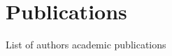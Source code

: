 \chapter*{Publications}
\label{chap:Publications}


List of authors academic publications

\begingroup
\titleformat{\chapter}[display]
    {\normalfont\huge\bfseries}{\chaptertitlename\ \thechapter}{20pt}{\Huge}
\titlespacing*{\chapter}{0pt}{0pt}{-80pt}
\renewcommand\bibname{}
\begin{thebibliography}{1}


\end{thebibliography}
\endgroup

%
